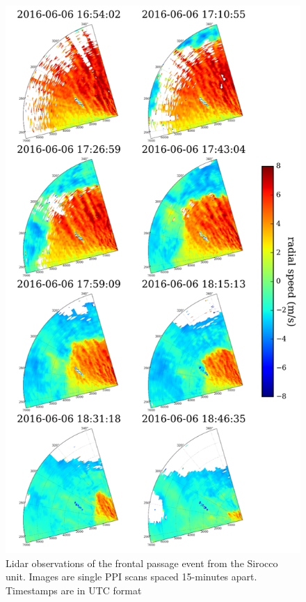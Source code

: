 \clearpage
\begin{figure}[htbp]
    \centering
        \includegraphics[width=1.0\textwidth, height=1.0\textheight, keepaspectratio]{graphics/results/balcony-addendum/lidar_front_ppis_8up.png}
    \caption{Lidar observations of the frontal passage event from the Sirocco unit. Images are single PPI scans spaced 15-minutes apart. Timestamps are in UTC format}
    \label{fig:lidar_front_ppis_8up}
\end{figure}
\clearpage

